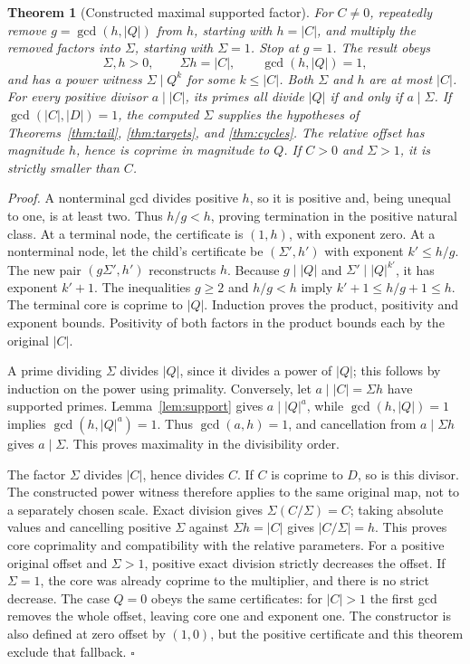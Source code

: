 \documentclass[11pt,letterpaper]{article}
\newtheorem{theorem}{Theorem}
\newenvironment{proof}{\noindent\textit{Proof.}}{\hfill\(\square\)}
\begin{document}
\begin{theorem}[Constructed maximal supported factor]
\label{thm:peel}
For \(C\ne0\), repeatedly remove \(g=\gcd(h,|Q|)\) from
\(h\), starting with \(h=|C|\), and multiply the removed factors into
\(\Sigma\), starting with \(\Sigma=1\). Stop at \(g=1\). The result obeys
\[
\Sigma,h>0,\qquad \Sigma h=|C|,\qquad \gcd(h,|Q|)=1,
\]
and has a power witness \(\Sigma\mid Q^k\) for some \(k\le|C|\).
Both \(\Sigma\) and \(h\) are at most \(|C|\).
For every positive divisor \(a\mid|C|\), its primes all divide \(|Q|\)
if and only if \(a\mid\Sigma\).
If \(\gcd(|C|,|D|)=1\), the computed \(\Sigma\) supplies the hypotheses
of Theorems~\ref{thm:tail}, \ref{thm:targets}, and \ref{thm:cycles}.
The relative offset has magnitude \(h\), hence is coprime in magnitude to
\(Q\). If \(C>0\) and \(\Sigma>1\), it is strictly smaller than \(C\).
\end{theorem}
\begin{proof}
A nonterminal gcd divides positive \(h\), so it is positive and, being
unequal to one, is at least two. Thus \(h/g<h\), proving termination in
the positive natural class. At a terminal node, the certificate is
\((1,h)\), with exponent zero. At a nonterminal node, let the child's
certificate be \((\Sigma',h')\) with exponent \(k'\le h/g\).
The new pair \((g\Sigma',h')\) reconstructs \(h\). Because \(g\mid|Q|\)
and \(\Sigma'\mid |Q|^{k'}\), it has exponent \(k'+1\).
The inequalities \(g\ge2\) and \(h/g<h\) imply
\(k'+1\le h/g+1\le h\). The terminal core is coprime to \(|Q|\).
Induction proves the product, positivity and exponent bounds. Positivity
of both factors in the product bounds each by the original \(|C|\).

A prime dividing \(\Sigma\) divides \(|Q|\), since it divides a power
of \(|Q|\); this follows by induction on the power using primality.
Conversely, let \(a\mid|C|=\Sigma h\) have supported primes.
Lemma~\ref{lem:support} gives \(a\mid|Q|^a\), while
\(\gcd(h,|Q|)=1\) implies \(\gcd(h,|Q|^a)=1\).
Thus \(\gcd(a,h)=1\), and cancellation from \(a\mid\Sigma h\) gives
\(a\mid\Sigma\). This proves maximality in the divisibility order.

The factor \(\Sigma\) divides \(|C|\), hence divides \(C\).
If \(C\) is coprime to \(D\), so is this divisor. The constructed power
witness therefore applies to the same original map, not to a separately
chosen scale. Exact division gives
\(\Sigma(C/\Sigma)=C\); taking absolute values and cancelling positive
\(\Sigma\) against \(\Sigma h=|C|\) gives \(|C/\Sigma|=h\).
This proves core coprimality and compatibility with the relative parameters.
For a positive original offset and \(\Sigma>1\), positive exact division
strictly decreases the offset. If \(\Sigma=1\), the core was already
coprime to the multiplier, and there is no strict decrease.
The case \(Q=0\) obeys the same certificates: for \(|C|>1\) the first
gcd removes the whole offset, leaving core one and exponent one.
The constructor is also defined at zero offset by \((1,0)\), but the
positive certificate and this theorem exclude that fallback.
\end{proof}
\end{document}
